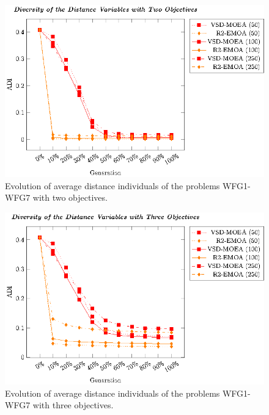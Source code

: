 \begin{figure}[t]
\centering
%
\includegraphics[]{Images/Graphic-Diversity_2obj_tikz-figure1.eps}
\caption{Evolution of average distance individuals of the problems WFG1-WFG7 with two objectives.}\label{fig:Diversity_2obj}
\end{figure}



%
%

\begin{figure}[t]
\centering
%
\includegraphics[]{Images/Graphic-Diversity_3obj_tikz-figure1.eps}
\caption{Evolution of average distance individuals of the problems WFG1-WFG7 with three objectives.}\label{fig:Diversity_3obj}
\end{figure}
%

